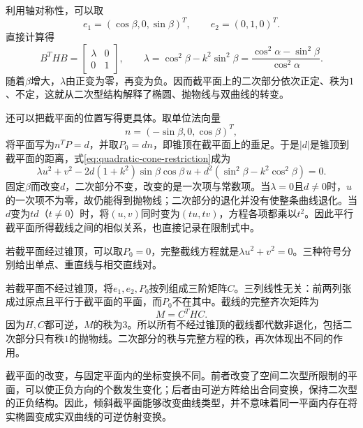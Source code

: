 利用轴对称性，可以取
\begin{equation*}
    e_1=(\cos\beta,0,\sin\beta)^T , \qquad e_2=(0,1,0)^T .
\end{equation*}
直接计算得
\begin{equation}\label{eq:quadratic-section-restriction-matrix}
    B^THB=\left[\begin{matrix}\lambda&0\\0&1\end{matrix}\right] , \qquad
    \lambda=\cos^2\beta-k^2\sin^2\beta
           =\frac{\cos^2\alpha-\sin^2\beta}{\cos^2\alpha} .
\end{equation}
随着\(\beta\)增大，\(\lambda\)由正变为零，再变为负。因而截平面上的二次部分依次正定、秩为\(1\)、不定，这就从二次型结构解释了椭圆、抛物线与双曲线的转变。

还可以把截平面的位置写得更具体。取单位法向量
\begin{equation*}
    n=(-\sin\beta,0,\cos\beta)^T ,
\end{equation*}
将平面写为\(n^TP=d\)，并取\(P_0=dn\)，即锥顶在截平面上的垂足。于是\(|d|\)是锥顶到截平面的距离，式\eqref{eq:quadratic-cone-restriction}成为
\begin{equation}\label{eq:quadratic-section-normal-offset}
    \lambda u^2+v^2-2d(1+k^2)\sin\beta\cos\beta\,u
    +d^2(\sin^2\beta-k^2\cos^2\beta)=0 .
\end{equation}
\newpage
固定\(\beta\)而改变\(d\)，二次部分不变，改变的是一次项与常数项。当\(\lambda=0\)且\(d\ne0\)时，\(u\)的一次项不为零，故仍能得到抛物线；二次部分的退化并没有使整条曲线退化。当\(d\)变为\(td\)（\(t\ne0\)）时，将\((u,v)\)同时变为\((tu,tv)\)，方程各项都乘以\(t^2\)。因此平行截平面所得截线之间的相似关系，也直接记录在限制式中。

若截平面经过锥顶，可以取\(P_0=0\)，完整截线方程就是\(\lambda u^2+v^2=0\)。三种符号分别给出单点、重直线与相交直线对。

若截平面不经过锥顶，将\(e_1,e_2,P_0\)按列组成三阶矩阵\(C\)。三列线性无关：前两列张成过原点且平行于截平面的平面，而\(P_0\)不在其中。截线的完整齐次矩阵为
\begin{equation*}
    M=C^THC .
\end{equation*}
因为\(H,C\)都可逆，\(M\)的秩为\(3\)。所以所有不经过锥顶的截线都代数非退化，包括二次部分只有秩\(1\)的抛物线。二次部分的秩与完整方程的秩，再次体现出不同的作用。

截平面的改变，与固定平面内的坐标变换不同。前者改变了空间二次型所限制的平面，可以使正负方向的个数发生变化；后者由可逆方阵给出合同变换，保持二次型的正负结构。因此，倾斜截平面能够改变曲线类型，并不意味着同一平面内存在将实椭圆变成实双曲线的可逆仿射变换。

